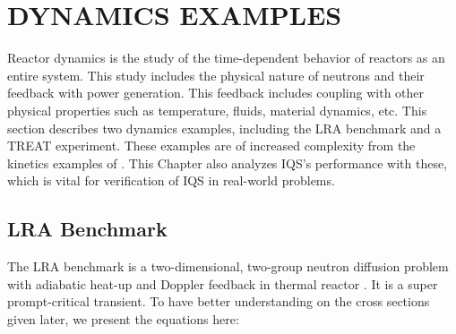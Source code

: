 %
%
%



\chapter{DYNAMICS EXAMPLES \label{sect:dyn}}

Reactor dynamics is the study of the time-dependent behavior of reactors as an entire system. This study includes the physical nature of neutrons and their feedback with power generation.  This feedback includes coupling with other physical properties such as temperature, fluids, material dynamics, etc.  This section describes two dynamics examples, including the LRA benchmark and a TREAT experiment.  These examples are of increased complexity from the kinetics examples of .  This Chapter also analyzes IQS's performance with these, which is vital for verification of IQS in real-world problems.

\section{LRA Benchmark}

The LRA benchmark is a two-dimensional, two-group neutron diffusion problem with adiabatic heat-up and Doppler feedback in thermal reactor \cite{ANL_BPB}.  It is a super prompt-critical transient.  To have better understanding on the cross sections given later, we present the equations here:

